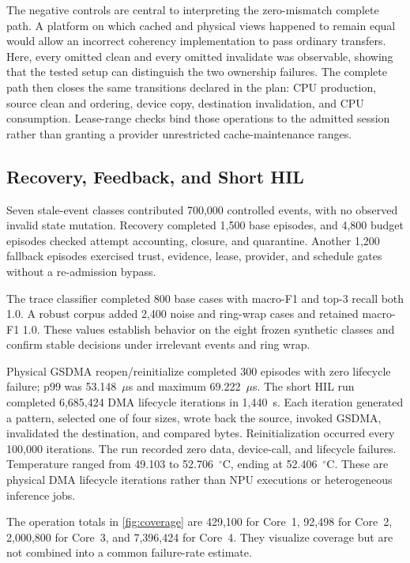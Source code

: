 \documentclass[lettersize,journal]{IEEEtran}
\begin{document}
The negative controls are central to interpreting the zero-mismatch complete
path. A platform on which cached and physical views happened to remain equal
would allow an incorrect coherency implementation to pass ordinary transfers.
Here, every omitted clean and every omitted invalidate was observable, showing
that the tested setup can distinguish the two ownership failures. The complete
path then closes the same transitions declared in the plan: CPU production,
source clean and ordering, device copy, destination invalidation, and CPU
consumption. Lease-range checks bind those operations to the admitted session
rather than granting a provider unrestricted cache-maintenance ranges.

\subsection{Recovery, Feedback, and Short HIL}
Seven stale-event classes contributed 700,000 controlled events, with no
observed invalid state mutation. Recovery completed 1,500 base episodes, and
4,800 budget episodes checked attempt accounting, closure, and quarantine.
Another 1,200 fallback episodes exercised trust, evidence, lease, provider, and
schedule gates without a re-admission bypass.

The trace classifier completed 800 base cases with macro-F1 and top-3 recall
both 1.0. A robust corpus added 2,400 noise and ring-wrap cases and retained
macro-F1 1.0. These values establish behavior on the eight frozen synthetic
classes and confirm stable decisions under irrelevant events and ring wrap.

Physical GSDMA reopen/reinitialize completed 300 episodes with zero lifecycle
failure; p99 was 53.148~$\mu$s and maximum 69.222~$\mu$s. The short HIL run
completed 6,685,424 DMA lifecycle iterations in 1,440~s. Each iteration
generated a pattern, selected one of four sizes, wrote back the source, invoked
GSDMA, invalidated the destination, and compared bytes. Reinitialization
occurred every 100,000 iterations. The run recorded zero data, device-call, and
lifecycle failures. Temperature ranged from 49.103 to 52.706~$^\circ$C, ending
at 52.406~$^\circ$C. These are physical DMA lifecycle iterations rather than
NPU executions or heterogeneous inference jobs.

The operation totals in \cref{fig:coverage} are 429,100 for Core~1, 92,498 for
Core~2, 2,000,800 for Core~3, and 7,396,424 for Core~4. They visualize coverage
but are not combined into a common failure-rate estimate.
\end{document}
